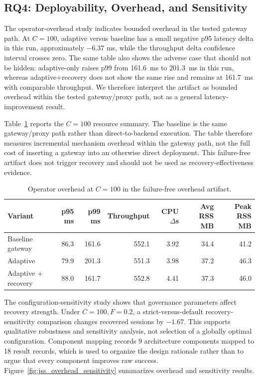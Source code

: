 \documentclass[5p,times]{elsarticle}
\begin{document}
\subsection{RQ4: Deployability, Overhead, and Sensitivity}

The operator-overhead study indicates bounded overhead in the tested gateway path. At $C{=}100$, adaptive versus baseline has a small negative p95 latency delta in this run, approximately $-6.37$ ms, while the throughput delta confidence interval crosses zero. The same table also shows the adverse case that should not be hidden: adaptive-only raises p99 from 161.6~ms to 201.3~ms in this run, whereas adaptive+recovery does not show the same rise and remains at 161.7~ms with comparable throughput. We therefore interpret the artifact as bounded overhead within the tested gateway/proxy path, not as a general latency-improvement result.

Table~\ref{tab:operator_overhead_c100} reports the $C{=}100$ resource summary. The baseline is the same gateway/proxy path rather than direct-to-backend execution. The table therefore measures incremental mechanism overhead within the gateway path, not the full cost of inserting a gateway into an otherwise direct deployment. This failure-free artifact does not trigger recovery and should not be used as recovery-effectiveness evidence.

\begin{table}[t]
\centering
\caption{Operator overhead at $C{=}100$ in the failure-free overhead artifact.}
\label{tab:operator_overhead_c100}
\footnotesize
\begin{tabular}{@{}>{\raggedright\arraybackslash}p{}rrrrrr@{}}
\toprule
\textbf{Variant} & \textbf{p95 ms} & \textbf{p99 ms} & \textbf{Throughput} & \textbf{CPU $\Delta$s} & \textbf{Avg RSS MB} & \textbf{Peak RSS MB} \\
\midrule
Baseline gateway & 86.3 & 161.6 & 552.1 & 3.92 & 34.4 & 41.2 \\
Adaptive & 79.9 & 201.3 & 551.3 & 3.98 & 37.2 & 46.3 \\
Adaptive + recovery & 88.0 & 161.7 & 552.8 & 4.41 & 37.3 & 46.0 \\
\bottomrule
\end{tabular}
\end{table}

The configuration-sensitivity study shows that governance parameters affect recovery strength. Under $C{=}100,F{=}0.2$, a strict-versus-default recovery-sensitivity comparison changes recovered sessions by $-1.67$. This supports qualitative robustness and sensitivity analysis, not selection of a globally optimal configuration. Component mapping records 9 architecture components mapped to 18 result records, which is used to organize the design rationale rather than to argue that every component improves raw success. Figure~\ref{fig:jss_overhead_sensitivity} summarizes overhead and sensitivity results.
\end{document}
